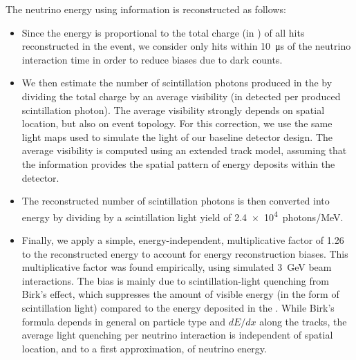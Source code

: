 The neutrino energy using  information is reconstructed as follows:
\begin{itemize}
\item Since the energy is proportional to the total charge (in ) of all  hits reconstructed in the event, we consider only hits within \SI{10}{\micro\second} of the neutrino interaction time in order to reduce biases due to  dark counts.
%
\item We then estimate the number of scintillation photons produced in the  by dividing the total charge by an average  visibility (in detected  per produced scintillation photon). The average visibility strongly depends  on spatial location, but %
also on event topology. For this correction, we use the same light maps used to simulate the light of our baseline detector design. The average visibility is computed using an extended track model, assuming that the  information provides the spatial pattern of energy deposits within the detector. 
%
\item The reconstructed number of scintillation photons is then converted into energy by dividing by a scintillation light yield of \SI{2.4e4}{photons/MeV}.
%
\item Finally, we apply a simple, energy-independent, multiplicative factor of 1.26  to the reconstructed energy to account for energy reconstruction biases. This multiplicative factor was found empirically, using simulated \SI{3}{\GeV} beam \nue {} interactions. The bias is mainly due to scintillation-light quenching from Birk's effect, which suppresses %
the amount of visible energy (in the form of scintillation light) compared to the energy deposited in the . While Birk's formula depends in general on particle type and $dE/dx$ along the tracks, the average light quenching per neutrino interaction is independent of spatial location, and to a first approximation, %
of neutrino energy. 
\end{itemize}

